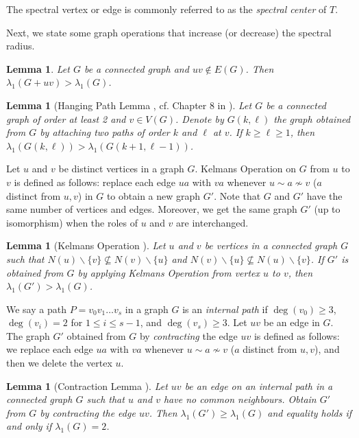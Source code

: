 \documentclass[11pt]{article}
\theoremstyle{plain}
\newtheorem{lemma}[theorem]{Lemma}
\numberwithin{equation}{section}
\begin{document}
The spectral vertex or edge is commonly referred to as the \emph{spectral center} of $T$. 

Next, we state some graph operations that increase (or decrease) the spectral radius.

\begin{lemma}\label{lemma:edge_addition} Let $G$ be a connected graph and $uv\notin E(G)$. Then $\lambda_1(G+uv)>\lambda_1(G)$. 
\end{lemma}

\begin{lemma}[Hanging Path Lemma \cite{Li_Feng_1979}, cf. Chapter 8 in \cite{CRS_2010}] \label{lemma:hanging_path} Let $G$ be a connected graph of order at least 2 and $v\in V(G)$. Denote by $G(k, \ell)$ the graph obtained from $G$ by attaching two paths of order $k$ and $\ell$ at $v$. If $k\ge \ell\ge 1$, then $\lambda_1(G(k, \ell)) > \lambda_1(G(k+1, \ell - 1))$.
\end{lemma}

Let $u$ and $v$ be distinct vertices in a graph $G$. Kelmans Operation on $G$ from $u$ to $v$ is defined as follows: replace each edge $ua$ with $va$ whenever $u\sim a\nsim v$ ($a$ distinct from $u,v$) in $G$ to obtain a new graph $G'$. Note that $G$ and $G'$ have the same number of vertices and edges. Moreover, we get the same graph $G'$ (up to isomorphism) when the roles of $u$ and $v$ are interchanged.   

\begin{lemma}[Kelmans Operation \cite{Csikvari_2009}]\label{lemma:Kelmans} Let $u$ and $v$ be vertices in a connected graph $G$ such that $N(u)\backslash \{v\} \nsubseteq N(v)\backslash \{u\}$ and $N(v)\backslash \{u\} \nsubseteq N(u)\backslash \{v\}$. If $G'$ is obtained from $G$ by applying Kelmans Operation from vertex $u$ to $v$, then $\lambda_1(G')>\lambda_1(G)$. 
\end{lemma}

We say a path $P=v_0 v_1\ldots v_s$ in a graph $G$ is an \emph{internal path} if $\deg(v_0)\ge 3$, $\deg(v_i)=2$ for $1\leq i \leq s-1$, and $\deg(v_s)\ge 3$. Let $uv$ be an edge in $G$. The graph $G'$ obtained from $G$ by \emph{contracting} the edge $uv$ is defined as follows: we replace each edge $ua$ with $va$ whenever $u\sim a \nsim v$ ($a$ distinct from $u,v$), and then we delete the vertex $u$. 

\begin{lemma}[Contraction Lemma \cite{Mckee_2018}]\label{lemma:Contraction} Let $uv$ be an edge on an internal path in a connected graph $G$ such that $u$ and $v$ have no common neighbours. Obtain $G'$ from $G$ by contracting the edge $uv$. Then $\lambda_1(G')\ge \lambda_1(G)$ and equality holds if and only if $\lambda_1(G)=2$.
\end{lemma}
\end{document}
